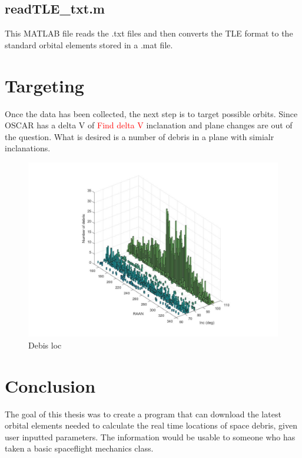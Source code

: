 \documentclass[12pt]{report}
\begin{document}
		\subsection{readTLE\_txt.m}
		This MATLAB file reads the .txt files and then converts the TLE format to the standard orbital elements stored in a .mat file. 
		
		
		\section{Targeting}
		Once the data has been collected, the next step is to target possible orbits. Since OSCAR has a delta V of \textcolor{red}{Find delta V} inclanation and plane changes are out of the question. What is desired is a number of debris in a plane with simialr inclanations.
		
		\begin{figure}[!]
			\centering
			\includegraphics[width=0.7\linewidth]{rann_inc}
			\caption{Debis loc}
			\label{fig:ranninc}
		\end{figure}
		
	
	\section{Conclusion}
	The goal of this thesis was to create a program that can download the latest orbital elements needed to calculate the real time locations of space debris, given user inputted parameters. The information would be usable to someone who has taken a basic spaceflight mechanics class. 
	

	
		
		
\end{document}
